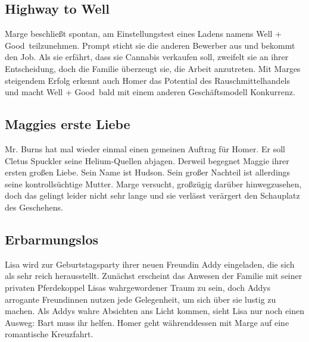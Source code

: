 
\subsection{Highway to Well}
Marge beschließt spontan, am Einstellungstest eines Ladens namens \glqq Well + Good\grqq\ teilzunehmen. Prompt sticht sie die anderen Bewerber aus und bekommt den Job. Als sie erfährt, dass sie Cannabis verkaufen soll, zweifelt sie an ihrer Entscheidung, doch die Familie überzeugt sie, die Arbeit anzutreten. Mit Marges steigendem Erfolg erkennt auch Homer das Potential des Rauschmittelhandels und macht \glqq Well + Good\grqq\ bald mit einem anderen Geschäftsmodell Konkurrenz.


\subsection{Maggies erste Liebe}\label{YABF13}
Mr. Burns hat mal wieder einmal einen gemeinen Auftrag für Homer. Er soll Cletus Spuckler seine Helium-Quellen abjagen. Derweil begegnet Maggie ihrer ersten großen Liebe. Sein Name ist Hudson. Sein großer Nachteil ist allerdings seine kontrollsüchtige Mutter. Marge versucht, großzügig darüber hinwegzusehen, doch das gelingt leider nicht sehr lange und sie verlässt verärgert den Schauplatz des Geschehens.


\subsection{Erbarmungslos}
Lisa wird zur Geburtstagsparty ihrer neuen Freundin Addy eingeladen, die sich als sehr reich herausstellt. Zunächst erscheint das Anwesen der Familie mit seiner privaten Pferdekoppel Lisas wahrgewordener Traum zu sein, doch Addys arrogante Freundinnen nutzen jede Gelegenheit, um sich über sie lustig zu machen. Als Addys wahre Absichten ans Licht kommen, sieht Lisa nur noch einen Ausweg: Bart muss ihr helfen. Homer geht währenddessen mit Marge auf eine romantische Kreuzfahrt.

